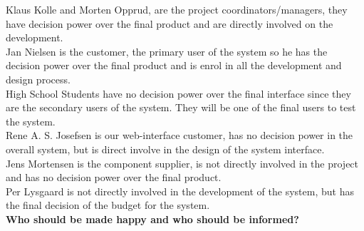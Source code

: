 Klaus Kolle and Morten Opprud, are the project coordinators/managers, they
have decision power over the final product and are directly involved on the
development.\\

Jan Nielsen is the customer, the primary user of the system so he has the
decision power over the final product and is enrol in all the development and design process.\\

High School Students have no decision power over the final interface since they
are the secondary users of the system. They will be one of the final users to test the system.\\

Rene A. S. Josefsen is our web-interface customer, has no decision power in the
overall system, but is direct involve in the design of the system interface.\\

Jens Mortensen is the component supplier, is not directly involved in the
project and has no decision power over the final product.\\

Per Lysgaard is not directly involved in the development of the system, but has the final decision of the budget for the system.\\

\textbf{{\Huge Who should be made happy and who should be informed?}}

